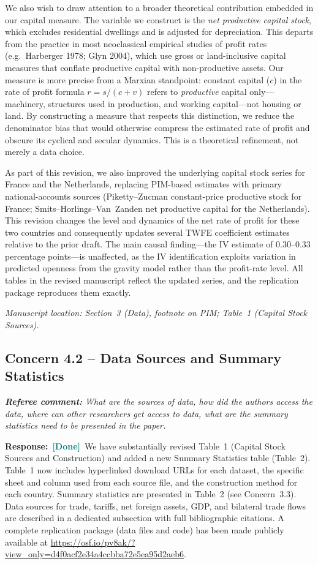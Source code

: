 \documentclass[11pt]{article}
\newcommand{\RC}[1]{\begin{refereebox}\textit{\textbf{Referee comment:} #1}\end{refereebox}}
\newcommand{\AR}{\noindent\textbf{Response:}\ }
\newcommand{\done}{\textcolor{teal}{\textbf{[Done]}}}
\begin{document}
We also wish to draw attention to a broader theoretical contribution embedded in our capital measure. The variable we construct is the \emph{net productive capital stock}, which excludes residential dwellings and is adjusted for depreciation. This departs from the practice in most neoclassical empirical studies of profit rates (e.g.\ Harberger 1978; Glyn 2004), which use gross or land-inclusive capital measures that conflate productive capital with non-productive assets. Our measure is more precise from a Marxian standpoint: constant capital ($c$) in the rate of profit formula $r = s/(c+v)$ refers to \emph{productive} capital only---machinery, structures used in production, and working capital---not housing or land. By constructing a measure that respects this distinction, we reduce the denominator bias that would otherwise compress the estimated rate of profit and obscure its cyclical and secular dynamics. This is a theoretical refinement, not merely a data choice.

As part of this revision, we also improved the underlying capital stock series for France and the Netherlands, replacing PIM-based estimates with primary national-accounts sources (Piketty--Zucman constant-price productive stock for France; Smits--Horlings--Van~Zanden net productive capital for the Netherlands). This revision changes the level and dynamics of the net rate of profit for these two countries and consequently updates several TWFE coefficient estimates relative to the prior draft. The main causal finding---the IV estimate of 0.30--0.33 percentage points---is unaffected, as the IV identification exploits variation in predicted openness from the gravity model rather than the profit-rate level. All tables in the revised manuscript reflect the updated series, and the replication package reproduces them exactly.

\smallskip\noindent\textit{Manuscript location: Section~3 (Data), footnote on PIM; Table~1 (Capital Stock Sources).}

\subsection*{Concern 4.2 -- Data Sources and Summary Statistics}

\RC{What are the sources of data, how did the authors access the data, where can other researchers get access to data, what are the summary statistics need to be presented in the paper.}

\AR \done\ We have substantially revised Table~1 (Capital Stock Sources and Construction) and added a new Summary Statistics table (Table~2). Table~1 now includes hyperlinked download URLs for each dataset, the specific sheet and column used from each source file, and the construction method for each country. Summary statistics are presented in Table~2 (see Concern~3.3). Data sources for trade, tariffs, net foreign assets, GDP, and bilateral trade flows are described in a dedicated subsection with full bibliographic citations. A complete replication package (data files and code) has been made publicly available at \url{https://osf.io/pv8ak/?view_only=d4f0acf2e34a4ccbba72e5ea95d2aeb6}.
\end{document}
